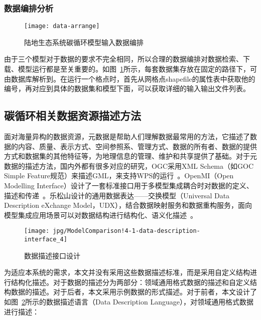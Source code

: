 \subsubsection{数据编排分析}
\label{subsubsec:data-arrange}
\begin{figure}[!htbp]
    \centering
    \texttt{[image: data-arrange]}
    \caption{陆地生态系统碳循环模型输入数据编排}
    \label{fig:data-arrange}
\end{figure}

由于三个模型对于数据的要求不完全相同，所以合理的数据编排对数据检索、下载、模型运行都是至关重要的。如图~\ref{fig:data-arrange}所示，每套数据集存放在固定的路径下，可由数据库解析到。在运行一个格点时，首先从网格点shapefile的属性表中获取他的编号，再对应到具体的数据集和模型下面，可以获取详细的输入输出文件列表。

\subsection{碳循环相关数据资源描述方法}
\label{sec:data-desc}
面对海量异构的数据资源，元数据是帮助人们理解数据最常用的方法，它描述了数据的内容、质量、表示方式、空间参照系、管理方式、数据的所有者、数据的提供方式和数据集的其他特征等，为地理信息的管理、维护和共享提供了基础。对于元数据的描述方法，国内外都有很多对应的研究，OGC采用XML Schema（如GOC Simple Feature规范）来描述GML，来支持WPS的运行~\cite{OGC-WPS}。OpenMI（Open Modelling Interface）设计了一套标准接口用于多模型集成耦合时对数据的定义、描述和传递~\cite{MOORE2005279}。乐松山设计的通用数据表达——交换模型（Universal Data Description eXchange Model，UDX），结合数据映射服务和数据重构服务，面向模型集成应用场景可以对数据结构进行结构化、语义化描述~\cite{乐松山2016面向地理模型共享与集成的数据适配方法研究}。

\begin{figure}[!htbp]
    \centering
    \texttt{[image: jpg/ModelComparison!4-1-data-description-interface\_4]}
    \caption{数据描述接口设计}
    \label{fig:ModelComparison!4-1-data-description-interface_4}
\end{figure}

为适应本系统的需求，本文并没有采用这些数据描述标准，而是采用自定义结构进行结构化描述。对于数据的描述分为两部分：领域通用格式数据的描述和自定义结构数据的描述。对于后者，本文采用示例数据的形式描述。对于前者，本文设计了如图~\ref{fig:ModelComparison!4-1-data-description-interface_4}所示的数据描述语言（Data Description Language），对领域通用格式数据进行描述：

